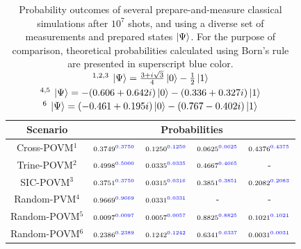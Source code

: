 \begin{table}[h!]
\centering
{\renewcommand{\arraystretch}{1.5}%
\begin{tabular}{ccccc} 
 \toprule
 Scenario & \multicolumn{4}{c}{Probabilities}  \\ \hline
 {Cross-POVM$^1$}   & $\scriptstyle0.3749^{\textcolor[rgb]{0,0,1}{0.3750}}$ 
                    & $\scriptstyle0.1250^{\textcolor[rgb]{0,0,1}{0.1250}}$ 
                    & $\scriptstyle0.0625^{\textcolor[rgb]{0,0,1}{0.0625}}$ 
                    & $\scriptstyle0.4376^{\textcolor[rgb]{0,0,1}{0.4375}}$ \\ \hline
 {Trine-POVM$^2$}   & $\scriptstyle0.4998^{\textcolor[rgb]{0,0,1}{0.5000}}$ 
                    & $\scriptstyle0.0335^{\textcolor[rgb]{0,0,1}{0.0335}}$ 
                    & $\scriptstyle0.4667^{\textcolor[rgb]{0,0,1}{0.4665}}$ 
                    & -  \\ \hline
 {SIC-POVM$^3$}     & $\scriptstyle0.3751^{\textcolor[rgb]{0,0,1}{0.3750}}$ 
                    & $\scriptstyle0.0315^{\textcolor[rgb]{0,0,1}{0.0316}}$ 
                    & $\scriptstyle0.3851^{\textcolor[rgb]{0,0,1}{0.3851}}$ 
                    & $\scriptstyle0.2082^{\textcolor[rgb]{0,0,1}{0.2083}}$ \\ \hline
 {Random-PVM$^4$}   & $\scriptstyle0.9669^{\textcolor[rgb]{0,0,1}{0.9669}}$ 
                    & $\scriptstyle0.0331^{\textcolor[rgb]{0,0,1}{0.0331}}$ 
                    & - 
                    & - \\ \hline
 {Random-POVM$^5$}  & $\scriptstyle0.0097^{\textcolor[rgb]{0,0,1}{0.0097}}$ 
                    & $\scriptstyle0.0057^{\textcolor[rgb]{0,0,1}{0.0057}}$ 
                    & $\scriptstyle0.8825^{\textcolor[rgb]{0,0,1}{0.8825}}$ 
                    & $\scriptstyle0.1021^{\textcolor[rgb]{0,0,1}{0.1021}}$ \\ \hline
 {Random-POVM$^6$}  & $\scriptstyle0.2386^{\textcolor[rgb]{0,0,1}{0.2389}}$ 
                    & $\scriptstyle0.1242^{\textcolor[rgb]{0,0,1}{0.1242}}$ 
                    & $\scriptstyle0.6341^{\textcolor[rgb]{0,0,1}{0.6337}}$ 
                    & $\scriptstyle0.0031^{\textcolor[rgb]{0,0,1}{0.0031}}$\\
 \bottomrule
\end{tabular}}
\caption{Probability outcomes of several prepare-and-measure classical simulations after $10^7$ shots, and using a diverse set of measurements and prepared states $\ket{\Psi}$. For the purpose of comparison, theoretical probabilities calculated using Born's rule are presented in superscript blue color. \\$^{1,2,3}\:\ket{\Psi}=\frac{3 + i \sqrt{3}}{4} \ket{0} - \frac{1}{2} \ket{1}$\\
$^{4,5}\:\ket{\Psi}= - (0.606 + 0.642 i) \ket{0} - (0.336 + 0.327i) \ket{1}$\\
$^{6}\:\ket{\Psi}= (-0.461 + 0.195i) \ket{0} - (0.767 - 0.402i) \ket{1}$}
\label{table:classical_results_pm}
\end{table}

